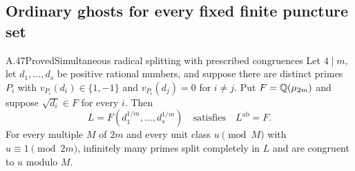 \subsection{Ordinary ghosts for every fixed finite puncture set}

\begin{statement}{A.47}{Proved}{Simultaneous radical splitting with prescribed congruences}
Let $4\mid m$, let $d_1,\ldots,d_s$ be positive rational
numbers, and suppose there are distinct primes $P_i$ with
$v_{P_i}(d_i)\in\{1,-1\}$ and $v_{P_i}(d_j)=0$ for
$i\ne j$. Put $F=\mathbb Q(\mu_{2m})$ and suppose
$\sqrt{d_i}\in F$ for every $i$. Then
\[
 L=F(d_1^{1/m},\ldots,d_s^{1/m})
 \quad\text{satisfies}\quad
 L^{\mathrm{ab}}=F.
 \tag{A.47.1}
\]
For every multiple $M$ of $2m$ and every unit class
$u\pmod M$ with $u\equiv1\pmod {2m}$, infinitely many
primes split completely in $L$ and are congruent to $u$
modulo $M$.
\end{statement}
